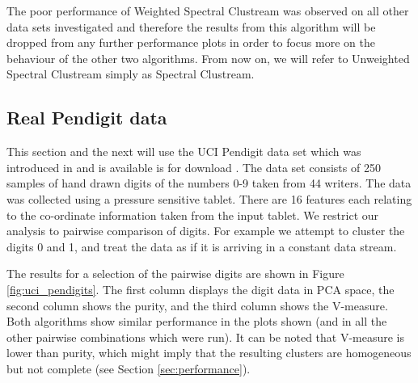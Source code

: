 The poor performance of Weighted Spectral Clustream was observed on all other data sets investigated and therefore the results from this algorithm  will be dropped from any further performance plots in order to focus more on the behaviour of the other two algorithms.  From now on, we will refer to Unweighted Spectral Clustream simply as Spectral Clustream.

\subsection{Real Pendigit data}
This section and the next will use the UCI Pendigit data set which was introduced in \cite{Alimoglu1996} and is available is for download \citep{Lichman2013}. The data set consists of 250 samples of hand drawn digits of the numbers 0-9 taken from 44 writers. The data was collected using a pressure sensitive tablet. There are 16 features each relating to the co-ordinate information taken from the input tablet. We restrict our analysis to pairwise comparison of digits. For example we attempt to cluster the digits 0 and 1, and treat the data as if it is arriving in a constant data stream. 

The results for a selection of the pairwise digits are shown in Figure \ref{fig:uci_pendigits}. The first column displays the digit data in PCA space, the second column shows the purity, and the third column shows the V-measure. Both algorithms show similar performance in the plots shown (and in all the other pairwise combinations which were run).  It can be noted that V-measure is lower than purity, which might imply that the resulting clusters are homogeneous but not complete (see Section \ref{sec:performance}). 

